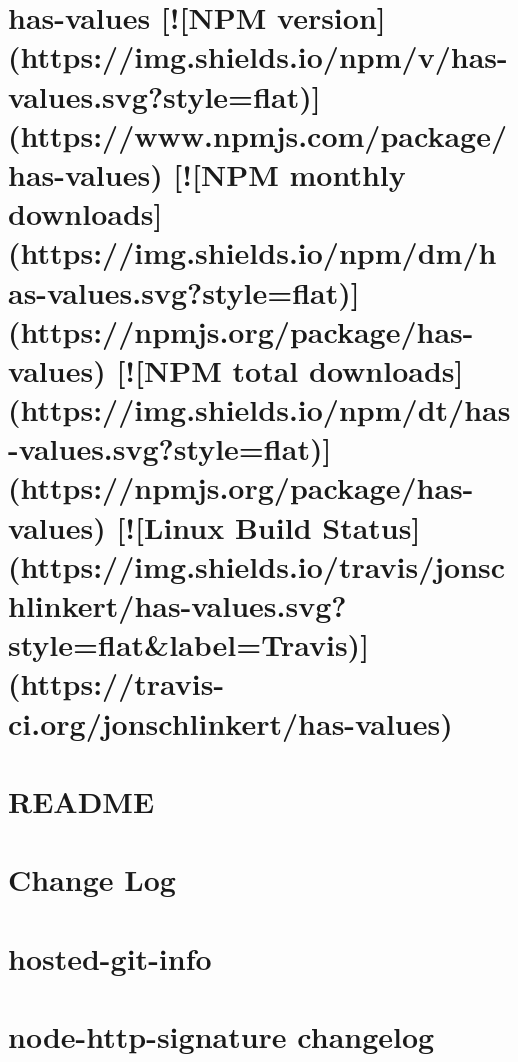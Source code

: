 \documentclass[twoside]{book}
\newcommand{\+}{\discretionary{\mbox{\scriptsize$\hookleftarrow$}}{}{}}
\begin{document}
\chapter{has-\/values \mbox{[}!\mbox{[}N\+PM version\mbox{]}(https\+://img.shields.\+io/npm/v/has-\/values.svg?style=flat)\mbox{]}(https\+://www.npmjs.\+com/package/has-\/values) \mbox{[}!\mbox{[}N\+PM monthly downloads\mbox{]}(https\+://img.shields.\+io/npm/dm/has-\/values.svg?style=flat)\mbox{]}(https\+://npmjs.org/package/has-\/values) \mbox{[}!\mbox{[}N\+PM total downloads\mbox{]}(https\+://img.shields.\+io/npm/dt/has-\/values.svg?style=flat)\mbox{]}(https\+://npmjs.org/package/has-\/values) \mbox{[}!\mbox{[}Linux Build Status\mbox{]}(https\+://img.shields.\+io/travis/jonschlinkert/has-\/values.svg?style=flat\&label=Travis)\mbox{]}(https\+://travis-\/ci.org/jonschlinkert/has-\/values)}
\label{md_dsmacc_vis_degree_node_modules_has-values_README}

\chapter{R\+E\+A\+D\+ME}
\label{md_dsmacc_vis_degree_node_modules_home-path_README}

\chapter{Change Log}
\label{md_dsmacc_vis_degree_node_modules_hosted-git-info_CHANGELOG}

\chapter{hosted-\/git-\/info}
\label{md_dsmacc_vis_degree_node_modules_hosted-git-info_README}

\chapter{node-\/http-\/signature changelog}
\label{md_dsmacc_vis_degree_node_modules_http-signature_CHANGES}

\end{document}
